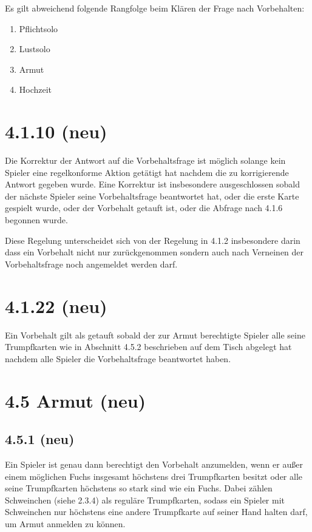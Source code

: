 Es gilt abweichend folgende Rangfolge beim Klären der Frage nach
Vorbehalten:

\begin{enumerate}
    \item Pflichtsolo
    \item Lustsolo
    \item Armut
    \item Hochzeit
\end{enumerate}

\section*{4.1.10 (neu)}

Die Korrektur der Antwort auf die Vorbehaltsfrage ist möglich solange kein
Spieler eine regelkonforme Aktion getätigt hat nachdem die zu korrigierende Antwort gegeben
wurde. Eine Korrektur ist insbesondere ausgeschlossen sobald der nächste Spieler seine Vorbehaltsfrage beantwortet
hat, oder die erste Karte gespielt wurde, oder der Vorbehalt getauft ist, oder
die Abfrage nach 4.1.6 begonnen wurde.

Diese Regelung unterscheidet sich von der Regelung in 4.1.2 insbesondere
darin dass ein Vorbehalt nicht nur zurückgenommen sondern auch nach Verneinen
der Vorbehaltsfrage noch angemeldet werden darf.

\section*{4.1.22 (neu)}

Ein Vorbehalt gilt als  getauft sobald der zur Armut berechtigte
Spieler alle seine Trumpfkarten wie in Abschnitt 4.5.2 beschrieben auf dem Tisch
abgelegt hat nachdem alle Spieler die Vorbehaltsfrage beantwortet haben.

\section*{4.5 Armut (neu)}

\subsection*{4.5.1 (neu)}
Ein Spieler ist genau dann berechtigt den Vorbehalt 
anzumelden, wenn er außer einem möglichen Fuchs insgesamt höchstens
drei Trumpfkarten besitzt oder alle seine Trumpfkarten höchstens so
stark sind wie ein Fuchs. Dabei zählen Schweinchen (siehe 2.3.4) als
reguläre Trumpfkarten, sodass ein Spieler mit Schweinchen nur
höchstens eine andere Trumpfkarte auf seiner Hand halten darf, um Armut
anmelden zu können.

